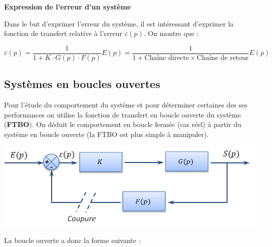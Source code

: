 \documentclass[10pt,fleqn]{article} %
\begin{document}
\begin{resultat}
\textbf{Expression de l'erreur d'un système}

Dans le but d'exprimer l'erreur du système, il est intéressant d'exprimer la
fonction de transfert relative à l'erreur $\varepsilon(p)$. On montre que : 

$$
\varepsilon(p) = \dfrac{1}{1+K \cdot G(p) \cdot F(p)} E(p) = \dfrac{\text{1}}{
1+\text{Chaîne directe}\times\text{Chaîne de retour}} E(p)
$$
\end{resultat}
%
%
%

\subsection{Systèmes en boucles ouvertes}

Pour l'étude du comportement du système et pour déterminer certaines des ses
performances on utilise la fonction de transfert en boucle ouverte du système
(\textbf{FTBO}). On déduit le comportement en boucle fermée (cas réel) à
partir du système en boucle ouverte (la FTBO est plus simple à manipuler). 

\begin{center}
  \includegraphics[width=.6\textwidth]{images/FTBO}
\end{center}

La boucle ouverte a donc la forme suivante : 
\begin{center}
\end{center}
\end{document}

